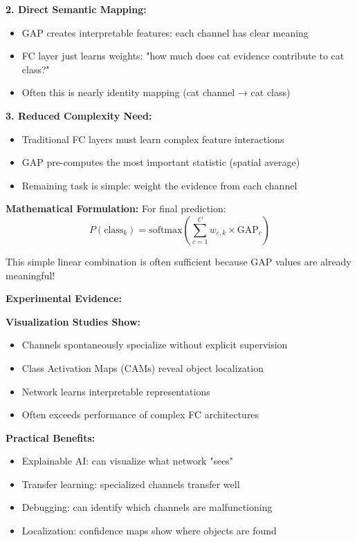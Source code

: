 \documentclass[12pt]{article}
\newcommand{\explanation}[1]{{\color{explanationcolor}#1}}
\begin{document}
\begin{enumerate}[(a)]
{{    \textbf{2. Direct Semantic Mapping:}
    \begin{itemize}
        \item GAP creates interpretable features: each channel has clear meaning
        \item FC layer just learns weights: "how much does cat evidence contribute to cat class?"
        \item Often this is nearly identity mapping (cat channel → cat class)
    \end{itemize}
    
    \textbf{3. Reduced Complexity Need:}
    \begin{itemize}
        \item Traditional FC layers must learn complex feature interactions
        \item GAP pre-computes the most important statistic (spatial average)
        \item Remaining task is simple: weight the evidence from each channel
    \end{itemize}
    
    \textbf{Mathematical Formulation:}
    For final prediction:
    \[
    P(\text{class}_k) = \text{softmax}\left(\sum_{c=1}^{C} w_{c,k} \times \text{GAP}_c\right)
    \]
    
    This simple linear combination is often sufficient because GAP values are already meaningful!
    }
    
    \textbf{Experimental Evidence:}
    
    \explanation{
    \textbf{Visualization Studies Show:}
    \begin{itemize}
        \item Channels spontaneously specialize without explicit supervision
        \item Class Activation Maps (CAMs) reveal object localization
        \item Network learns interpretable representations
        \item Often exceeds performance of complex FC architectures
    \end{itemize}
    
    \textbf{Practical Benefits:}
    \begin{itemize}
        \item Explainable AI: can visualize what network "sees"
        \item Transfer learning: specialized channels transfer well
        \item Debugging: can identify which channels are malfunctioning
        \item Localization: confidence maps show where objects are found
    \end{itemize}
    }
    
}
\end{enumerate}
\end{document}

